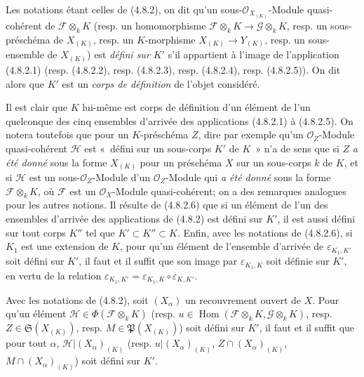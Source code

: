 \begin{definition}[4.8.4]
\label{IV.2.4.8.4-fr}
Les notations étant celles de (4.8.2), on dit qu'un
sous-$\mathcal O_{X_{(K)}}$-Module quasi-cohérent de
$\mathscr F\otimes_kK$ (resp. un homomorphisme
$\mathscr F\otimes_kK\to\mathscr G\otimes_kK$, resp. un sous-préschéma de
$X_{(K)}$, resp. un $K$-morphisme $X_{(K)}\to Y_{(K)}$, resp. un
sous-ensemble de $X_{(K)}$) est \emph{défini sur $K'$} s'il appartient à
l'image de l'application (4.8.2.1) (resp. (4.8.2.2), resp. (4.8.2.3), resp.
(4.8.2.4), resp. (4.8.2.5)). On dit alors que $K'$ est un \emph{corps de
définition} de l'objet considéré.
\end{definition}

Il est clair que $K$ lui-même est corps de définition d'un élément de l'un
quelconque des cinq ensembles d'arrivée des applications (4.8.2.1) à
(4.8.2.5). On notera toutefois que pour un $K$-préschéma $Z$, dire par exemple
qu'un $\mathcal O_Z$-Module quasi-cohérent $\mathscr H$ est «~défini sur un
sous-corps $K'$ de $K$~» n'a de sens que si $Z$ \emph{a été donné} sous la
forme $X_{(K)}$ pour un préschéma $X$ sur un sous-corps $k$ de $K$, et si
$\mathscr H$ est un sous-$\mathcal O_Z$-Module d'un $\mathcal O_Z$-Module qui
\emph{a été donné} sous la forme $\mathscr F\otimes_kK$, où $\mathscr F$ est
un $\mathcal O_X$-Module quasi-cohérent; on a des remarques analogues pour les
autres notions. Il résulte de (4.8.2.6) que si un élément de l'un des ensembles
d'arrivée des applications de (4.8.2) est défini sur $K'$, il est aussi défini
sur tout corps $K''$ tel que $K'\subset K''\subset K$. Enfin, avec les
notations de (4.8.2.6), si $K_1$ est une extension de $K$, pour qu'un élément
de l'ensemble d'arrivée de $\varepsilon_{K_1,K'}$ soit défini sur $K'$, il
faut et il suffit que son image par $\varepsilon_{K_1,K}$ soit définie sur
$K'$, en vertu de la relation
$\varepsilon_{K_1,K'}=\varepsilon_{K_1,K}\circ\varepsilon_{K,K'}$.

\begin{proposition}[4.8.5]
\label{IV.2.4.8.5-fr}
Avec les notations de (4.8.2), soit $(X_\alpha)$ un recouvrement ouvert de
$X$. Pour qu'un élément $\mathscr H\in\Phi(\mathscr F\otimes_kK)$ (resp.
$u\in\operatorname{Hom}(\mathscr F\otimes_kK,\mathscr G\otimes_kK)$, resp.
$Z\in\mathfrak S(X_{(K)})$, resp. $M\in\mathfrak P(X_{(K)})$) soit défini sur
$K'$, il faut et il suffit que pour tout $\alpha$,
$\mathscr H|(X_\alpha)_{(K)}$ (resp. $u|(X_\alpha)_{(K)}$,
$Z\cap(X_\alpha)_{(K)}$, $M\cap(X_\alpha)_{(K)}$) soit défini sur $K'$.
\end{proposition}

